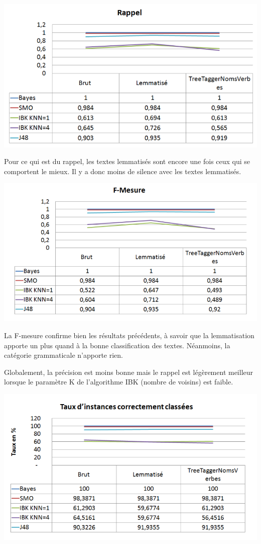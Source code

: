 \documentclass[a4paper,11pt]{article}
\begin{document}
\begin{center}
\includegraphics[scale=0.4]{rappel.png}
\end{center}

Pour ce qui est du rappel, les textes lemmatisés sont encore une fois ceux qui se comportent le mieux. Il y a donc moins de silence avec les textes lemmatisés.

\begin{center}
\includegraphics[scale=0.4]{fmesure.png}
\end{center}

La F-mesure confirme bien les résultats précédents, à savoir que la lemmatisation apporte un plus quand à la bonne classification des textes. Néanmoins, la catégorie grammaticale n’apporte rien.

Globalement, la précision est moins bonne mais le rappel est légèrement meilleur lorsque le paramètre K de l’algorithme IBK (nombre de voisins) est faible.

\begin{center}
\includegraphics[scale=0.4]{instClassees.png}
\end{center}
\end{document}
